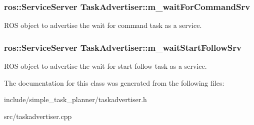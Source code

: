 \subsubsection[{\texorpdfstring{m\+\_\+wait\+For\+Command\+Srv}{m_waitForCommandSrv}}]{\setlength{\rightskip}{0pt plus 5cm}ros\+::\+Service\+Server Task\+Advertiser\+::m\+\_\+wait\+For\+Command\+Srv\hspace{0.3cm}{\ttfamily [private]}}\hypertarget{class_task_advertiser_a57822e31555f279e363c19555ff01683}{}\label{class_task_advertiser_a57822e31555f279e363c19555ff01683}
R\+OS object to advertise the wait for command task as a service. 
\subsubsection[{\texorpdfstring{m\+\_\+wait\+Start\+Follow\+Srv}{m_waitStartFollowSrv}}]{\setlength{\rightskip}{0pt plus 5cm}ros\+::\+Service\+Server Task\+Advertiser\+::m\+\_\+wait\+Start\+Follow\+Srv\hspace{0.3cm}{\ttfamily [private]}}\hypertarget{class_task_advertiser_a4d28e93a047d967b4a632a61ba94f314}{}\label{class_task_advertiser_a4d28e93a047d967b4a632a61ba94f314}
R\+OS object to advertise the wait for start follow task as a service. 

The documentation for this class was generated from the following files\+:\begin{DoxyCompactItemize}
\item 
include/simple\+\_\+task\+\_\+planner/taskadvertiser.\+h\item 
src/taskadvertiser.\+cpp\end{DoxyCompactItemize}
